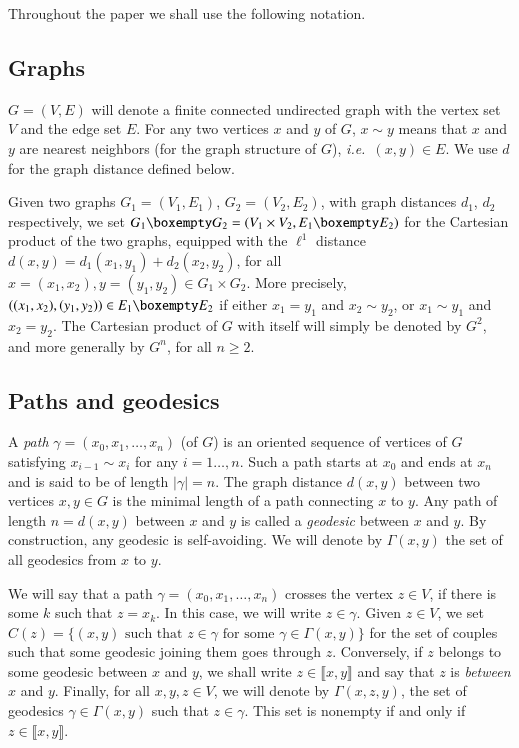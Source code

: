 \documentclass[11pt]{amsart}
\numberwithin{equation}{section}
\begin{document}
Throughout  the paper we shall use the following notation. 

\subsection*{Graphs}
$G=(V,E)$ will denote a finite connected undirected graph  with the vertex set $V$ and the edge set $E$.
For any two vertices $x$  and $y$ of $G$, $x \sim y$ means that 
$x$ and $y$ are nearest neighbors (for the graph structure of $G$), \textit{i.e.}\ $(x,y) \in E$. 
We use $d$ for the graph distance defined below.

Given two graphs $G_1=(V_1,E_1)$, $G_2=(V_2,E_2)$, with graph distances $d_1$, $d_2$ respectively, we set 
$G_1 \boxempty G_2 = (V_1 \times V_2, E_1 \boxempty E_2)$ for the Cartesian product of the two graphs, 
equipped with the $\ell^1$ distance $d(x,y)=d_1(x_1,y_1)+d_2(x_2,y_2)$, for all
$x=(x_1,x_2), y=(y_1,y_2) \in G_1 \times G_2$. More precisely, $((x_1,x_2),(y_1,y_2)) \in E_1 \boxempty E_2$
if either $x_1=y_1$ and $x_2 \sim y_2$, or $x_1 \sim y_1$ and $x_2=y_2$.
The Cartesian product of $G$ with itself will  simply be denoted by $G^2$,
and more generally by $G^n$, for all $n\geq 2.$

\subsection*{Paths and geodesics}
A \emph{path} $\gamma=(x_0,x_1,\dots,x_n)$ (of $G$) is an oriented sequence  
of vertices of $G$ satisfying $x_{i-1} \sim x_i$ for any $i=1\dots,n$. Such a path starts at $x_0$ and ends at $x_n$ and is said to be of length $|\gamma|=n$. 
The graph distance $d(x,y)$ between two vertices $x,y \in G$ is the minimal length of a path connecting $x$ to $y$. Any path of length $n=d(x,y)$ between $x$ and $y$ is called a \emph{geodesic} between $x$ and $y$. By construction, any geodesic is self-avoiding. We will denote by $\Gamma(x,y)$ the set of all geodesics from $x$ to $y$.

We will say that a path $\gamma=(x_0,x_1,\ldots,x_n)$ crosses the vertex $z\in V$, if there is some $k$ such that $z=x_k$. In this case, we will write $z\in \gamma.$ Given $z \in V$, we set $C(z)=\{(x,y) \mbox{ such that } z \in \gamma \mbox{ for some } \gamma \in \Gamma(x,y)\}$
for the set of couples such that some geodesic joining them goes through $z$.
Conversely, if $z$ belongs to some geodesic between $x$ and $y$, we shall write $z\in \llbracket x,y\rrbracket$ and say that $z$ is \emph{between} $x$ and $y$. Finally, for all $x,y,z\in V$, we will denote by $\Gamma(x,z,y)$, the set of geodesics $\gamma\in \Gamma(x,y)$ such that $z\in \gamma$. This set is nonempty if and only if $z\in \llbracket x,y\rrbracket$.
\end{document}
